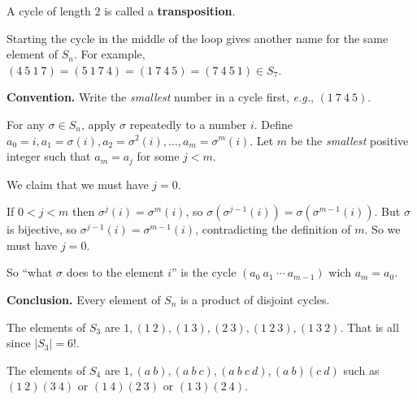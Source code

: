 \documentclass{notes}
\begin{document}
\begin{rmk}
  A cycle of length $2$ is called a {\boldmath \bfseries transposition}.
\end{rmk}

\begin{rmk}
  Starting the cycle in the middle of the loop gives another name for the same element of $S_n$.
  For example, $(4\ 5\ 1\ 7) = (5\ 1\ 7\ 4) = (1\ 7\ 4\ 5) = (7\ 4\ 5\ 1) \in S_7$.
\end{rmk}

{\boldmath \bfseries Convention.} Write the \textit{smallest} number in a cycle first, \textit{e.g.}, $(1\ 7\ 4\ 5)$.

For any $\sigma \in S_n$, apply $\sigma$ repeatedly to a number $i$.
Define $a_0 = i, a_1 = \sigma(i), a_2 = \sigma^2(i), \dots, a_m = \sigma^m(i)$.
Let $m$ be the \textit{smallest} positive integer such that $a_m = a_j$ for some $j < m$.

We claim that we must have $j = 0$.

\begin{prf}
  If $0 < j < m$ then $\sigma^j(i) = \sigma^m(i)$, so $\sigma(\sigma^{j - 1}(i)) = \sigma(\sigma^{m - 1}(i))$.
  But $\sigma$ is bijective, so $\sigma^{j - 1}(i) = \sigma^{m - 1}(i)$, contradicting the definition of $m$.
  So we must have $j = 0$.

  So ``what $\sigma$ does to the element $i$'' is the cycle $(a_0\ a_1\ \cdots\ a_{m - 1})$ wich $a_m = a_0$.
\end{prf}

{\boldmath \bfseries Conclusion.} Every element of $S_n$ is a product of disjoint cycles.

\begin{eg}
  The elements of $S_3$ are $1, (1\ 2), (1\ 3), (2\ 3), (1\ 2\ 3), (1\ 3\ 2)$.
  That is all since $\left | S_3 \right | = 6!$.
\end{eg}

\begin{eg}
  The elements of $S_4$ are $1, (a\ b), (a\ b\ c), (a\ b\ c\ d), (a\ b) (c\ d)$ such as $(1\ 2) (3\ 4)$ or $(1\ 4) (2\ 3)$ or $(1\ 3) (2\ 4)$.
\end{eg}
\end{document}

